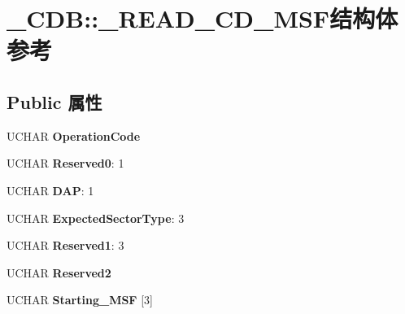 \hypertarget{struct___c_d_b_1_1___r_e_a_d___c_d___m_s_f}{}\section{\+\_\+\+C\+DB\+:\+:\+\_\+\+R\+E\+A\+D\+\_\+\+C\+D\+\_\+\+M\+S\+F结构体 参考}
\label{struct___c_d_b_1_1___r_e_a_d___c_d___m_s_f}
\subsection*{Public 属性}
\begin{DoxyCompactItemize}
\item 
\mbox{\label{struct___c_d_b_1_1___r_e_a_d___c_d___m_s_f_affb2d7d5a20aca471505509225a70261}} 
U\+C\+H\+AR {\bfseries Operation\+Code}
\item 
\mbox{\label{struct___c_d_b_1_1___r_e_a_d___c_d___m_s_f_ad6da3c55c1904e85ac3c2a702d7517c2}} 
U\+C\+H\+AR {\bfseries Reserved0}\+: 1
\item 
\mbox{\label{struct___c_d_b_1_1___r_e_a_d___c_d___m_s_f_a8a39965836522d17975b982d0e9e5a39}} 
U\+C\+H\+AR {\bfseries D\+AP}\+: 1
\item 
\mbox{\label{struct___c_d_b_1_1___r_e_a_d___c_d___m_s_f_aa275661f17e073c4b3e660499adf2321}} 
U\+C\+H\+AR {\bfseries Expected\+Sector\+Type}\+: 3
\item 
\mbox{\label{struct___c_d_b_1_1___r_e_a_d___c_d___m_s_f_abb97fc04e5468b5fc1e1e5de4e796635}} 
U\+C\+H\+AR {\bfseries Reserved1}\+: 3
\item 
\mbox{\label{struct___c_d_b_1_1___r_e_a_d___c_d___m_s_f_a8c35a0fa662c99d8d30bbe30b4678ebc}} 
U\+C\+H\+AR {\bfseries Reserved2}
\item 
\mbox{\label{struct___c_d_b_1_1___r_e_a_d___c_d___m_s_f_a911d1cf3ac1373fb9ac46ffde631fb03}} 
U\+C\+H\+AR {\bfseries Starting\+\_\+\+M\+SF} \mbox{[}3\mbox{]}

\end{DoxyCompactItemize}
